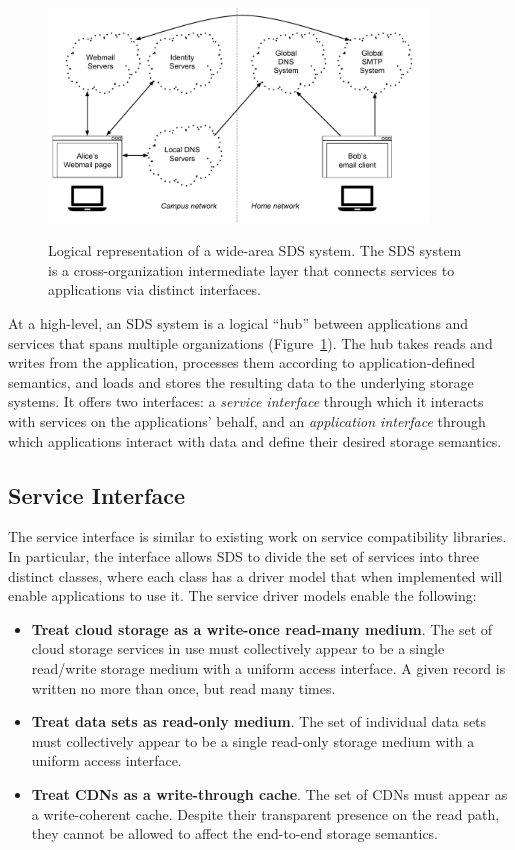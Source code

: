 \begin{figure}[h]
   \caption{Logical representation of a wide-area SDS system.  The SDS system
   is a cross-organization intermediate layer that connects services to
   applications via distinct interfaces.}
   \centering
   \includegraphics[width=0.9\textwidth,page=2]{figures/dissertation-figures}
   \label{fig:chap2-sds-overview}
\end{figure}

At a high-level, an SDS system is a logical ``hub'' between applications and
services that spans multiple organizations (Figure~\ref{fig:chap2-sds-overview}). 
The hub takes reads and writes from the application, processes them
according to application-defined semantics, and loads and stores the resulting
data to the underlying storage systems.
It offers two interfaces:  a \emph{service interface} through which it interacts with
services on the applications' behalf, and an \emph{application interface} through
which applications interact with data and define their desired storage
semantics.

\subsection{Service Interface}

The service interface is similar to existing work on service compatibility
libraries.  In particular, the interface allows SDS to divide the set of
services into three distinct classes, where each class has a driver model that
when implemented will enable applications to use it.  The service driver models
enable the following:

\begin{itemize}
   \item \textbf{Treat cloud storage as a write-once read-many medium}.  The set of cloud storage
      services in use must collectively appear to be a single
      read/write storage medium with a uniform access interface.  A given record
      is written no more than once, but read many times.
   \item \textbf{Treat data sets as read-only medium}.  The set of individual
      data sets must collectively appear to be a single read-only
      storage medium with a uniform access interface.
   \item \textbf{Treat CDNs as a write-through cache}.  The set of CDNs
      must appear as a write-coherent cache.  Despite their transparent presence
      on the read path, they cannot be allowed to affect the end-to-end storage
      semantics.
\end{itemize}


